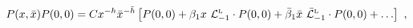 \begin{equation}
\label{PPPE_d}
 P(x,\bar x)P(0,0) = Cx^{-h}\bar x^{-\bar h}
\left[P(0,0) + \beta_1 x\ {\cal L}^{\rm \scriptscriptstyle L}_{-1}\cdot
P(0,0) + \bar\beta_1\bar x\ \bar {\cal L}^{\rm \scriptscriptstyle
L}_{-1}\cdot P(0,0) + \ldots\right]\ ,
\end{equation}

